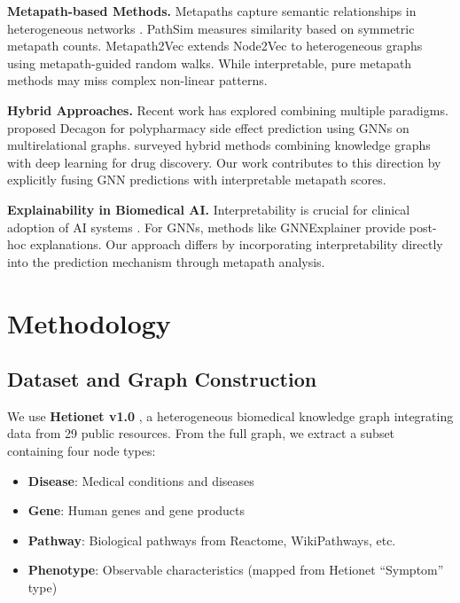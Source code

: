 \documentclass{article}
\begin{document}
\textbf{Metapath-based Methods.}
Metapaths capture semantic relationships in heterogeneous networks \citep{sun2011pathsim}. PathSim \citep{sun2011pathsim} measures similarity based on symmetric metapath counts. Metapath2Vec \citep{dong2017metapath2vec} extends Node2Vec to heterogeneous graphs using metapath-guided random walks. While interpretable, pure metapath methods may miss complex non-linear patterns.

\textbf{Hybrid Approaches.}
Recent work has explored combining multiple paradigms. \citet{zitnik2018modeling} proposed Decagon for polypharmacy side effect prediction using GNNs on multirelational graphs. \citet{bonner2022review} surveyed hybrid methods combining knowledge graphs with deep learning for drug discovery. Our work contributes to this direction by explicitly fusing GNN predictions with interpretable metapath scores.

\textbf{Explainability in Biomedical AI.}
Interpretability is crucial for clinical adoption of AI systems \citep{rudin2019stop}. For GNNs, methods like GNNExplainer \citep{ying2019gnnexplainer} provide post-hoc explanations. Our approach differs by incorporating interpretability directly into the prediction mechanism through metapath analysis.

\section{Methodology}
\label{sec:method}

\subsection{Dataset and Graph Construction}
\label{sec:data}

We use \textbf{Hetionet v1.0} \citep{himmelstein2017systematic}, a heterogeneous biomedical knowledge graph integrating data from 29 public resources. From the full graph, we extract a subset containing four node types:
\begin{itemize}
    \item \textbf{Disease}: Medical conditions and diseases
    \item \textbf{Gene}: Human genes and gene products
    \item \textbf{Pathway}: Biological pathways from Reactome, WikiPathways, etc.
    \item \textbf{Phenotype}: Observable characteristics (mapped from Hetionet ``Symptom'' type)
\end{itemize}
\end{document}

